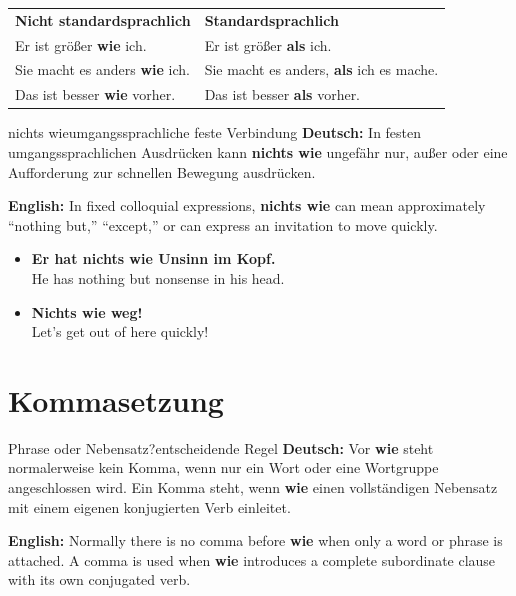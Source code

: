 \documentclass[a4paper,11pt]{article}
\newcommand{\GermanText}[1]{\textbf{Deutsch: }#1\par}
\newcommand{\EnglishText}[1]{{\small\color{SoftGray}\textbf{English: }#1\par}}
\newcommand{\ExampleItem}[2]{\item \textbf{#1}\\{\small\color{SoftGray}#2}}
\newcommand{\TableHead}[1]{\cellcolor{HeaderBlueDark}\color{white}\textbf{#1}}
\begin{document}
\begin{longtable}{>{\raggedright\arraybackslash}p{}>{\raggedright\arraybackslash}p{}}
\TableHead{Nicht standardsprachlich} & \TableHead{Standardsprachlich} \\
Er ist größer \textbf{wie} ich. & Er ist größer \textbf{als} ich.\\
Sie macht es anders \textbf{wie} ich. & Sie macht es anders, \textbf{als} ich es mache.\\
Das ist besser \textbf{wie} vorher. & Das ist besser \textbf{als} vorher.\\
\end{longtable}

\begin{grammarentry}{nichts wie}{umgangssprachliche feste Verbindung}
\GermanText{In festen umgangssprachlichen Ausdrücken kann \textbf{nichts wie} ungefähr \glqq nur\grqq, \glqq außer\grqq{} oder eine Aufforderung zur schnellen Bewegung ausdrücken.}
\EnglishText{In fixed colloquial expressions, \textbf{nichts wie} can mean approximately ``nothing but,'' ``except,'' or can express an invitation to move quickly.}
\end{grammarentry}

\begin{exbox}
\begin{itemize}
\ExampleItem{Er hat nichts wie Unsinn im Kopf.}{He has nothing but nonsense in his head.}
\ExampleItem{Nichts wie weg!}{Let's get out of here quickly!}
\end{itemize}
\end{exbox}

\section{Kommasetzung}

\begin{grammarentry}{Phrase oder Nebensatz?}{entscheidende Regel}
\GermanText{Vor \textbf{wie} steht normalerweise kein Komma, wenn nur ein Wort oder eine Wortgruppe angeschlossen wird. Ein Komma steht, wenn \textbf{wie} einen vollständigen Nebensatz mit einem eigenen konjugierten Verb einleitet.}
\EnglishText{Normally there is no comma before \textbf{wie} when only a word or phrase is attached. A comma is used when \textbf{wie} introduces a complete subordinate clause with its own conjugated verb.}
\end{grammarentry}
\end{document}
